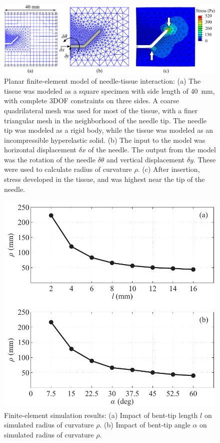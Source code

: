 \begin{figure}[!t]
\centering
\includegraphics[width = \textwidth]{Images/Chapter3/Abaqus/Abaqus}%
\caption[Planar finite-element model of needle-tissue interaction]{Planar finite-element model of needle-tissue interaction: (a) The tissue was modeled as a square specimen with side length of 40~mm, with complete 3DOF constraints on three sides. A coarse quadrilateral mesh was used for most of the tissue, with a finer triangular mesh in the neighborhood of the needle tip. The needle tip was modeled as a rigid body, while the tissue was modeled as an incompressible hyperelastic solid. (b) The input to the model was horizontal displacement $\delta x$ of the needle. The output from the model was the rotation of the needle $\delta\theta$ and vertical displacement $\delta y$. These were used to calculate radius of curvature $\rho$. (c) After insertion, stress developed in the tissue, and was highest near the tip of the needle.}
\label{fig:Abaqus}
\end{figure}

\begin{figure}[!t]
\centering
\includegraphics[width=0.6\columnwidth]{Images/Chapter3/AbaqusResults/AbaqusResults}%
\caption[Finite-element simulation results]{Finite-element simulation results: (a) Impact of bent-tip length $l$ on simulated radius of curvature $\rho$. (b) Impact of bent-tip angle $\alpha$ on simulated radius of curvature $\rho$.}
\label{fig:AbaqusResults}
\end{figure}

